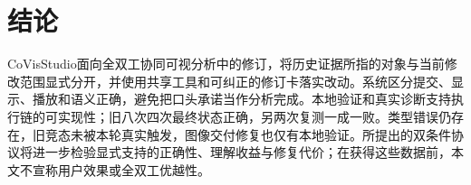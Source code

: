 \documentclass[conference]{IEEEtran}
\newcommand{\sys}{CoVisStudio}
\begin{document}
\section{结论}
\sys 面向全双工协同可视分析中的修订，将历史证据所指的对象与当前修改范围显式分开，并使用共享工具和可纠正的修订卡落实改动。系统区分提交、显示、播放和语义正确，避免把口头承诺当作分析完成。本地验证和真实诊断支持执行链的可实现性；旧八次四次最终状态正确，另两次复测一成一败。类型错误仍存在，旧竞态未被本轮真实触发，图像交付修复也仅有本地验证。所提出的双条件协议将进一步检验显式支持的正确性、理解收益与修复代价；在获得这些数据前，本文不宣称用户效果或全双工优越性。

\balance


\end{document}
